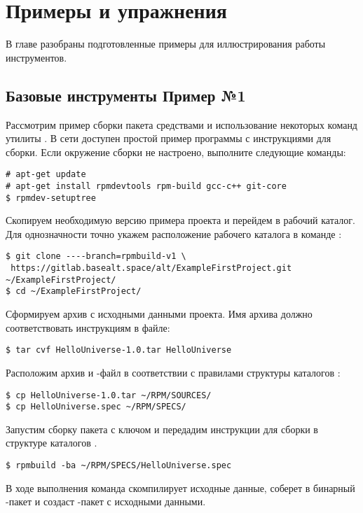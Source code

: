 \chapter{Примеры и упражнения}

В главе разобраны подготовленные примеры для иллюстрирования работы инструментов.

\section{Базовые инструменты  \textbf{Пример №1}}

Рассмотрим пример сборки пакета средствами  и использование
некоторых команд утилиты . В сети доступен простой пример 
программы с инструкциями для сборки.
Если окружение сборки  не настроено, выполните следующие команды:
\begin{verbatim}
# apt-get update
# apt-get install rpmdevtools rpm-build gcc-c++ git-core
$ rpmdev-setuptree
\end{verbatim}

Скопируем необходимую версию примера проекта и перейдем
в рабочий каталог. Для однозначности точно укажем расположение рабочего
каталога  в команде :
\begin{verbatim}
$ git clone ----branch=rpmbuild-v1 \
 https://gitlab.basealt.space/alt/ExampleFirstProject.git ~/ExampleFirstProject/
$ cd ~/ExampleFirstProject/
\end{verbatim}

Сформируем  архив с исходными данными проекта. Имя архива должно
соответствовать инструкциям в \Sys{.spec} файле:
\begin{verbatim}
$ tar cvf HelloUniverse-1.0.tar HelloUniverse
\end{verbatim}

Расположим архив и -файл в соответствии с правилами структуры каталогов
\Sys{RPM}:
\begin{verbatim}
$ cp HelloUniverse-1.0.tar ~/RPM/SOURCES/
$ cp HelloUniverse.spec ~/RPM/SPECS/
\end{verbatim}

Запустим сборку пакета с ключом  и передадим инструкции для сборки
в структуре каталогов \Sys{RPM}.
\begin{verbatim}
$ rpmbuild -ba ~/RPM/SPECS/HelloUniverse.spec
\end{verbatim}

В ходе выполнения команда скомпилирует исходные данные, соберет
в бинарный -пакет и создаст -пакет с исходными данными.

